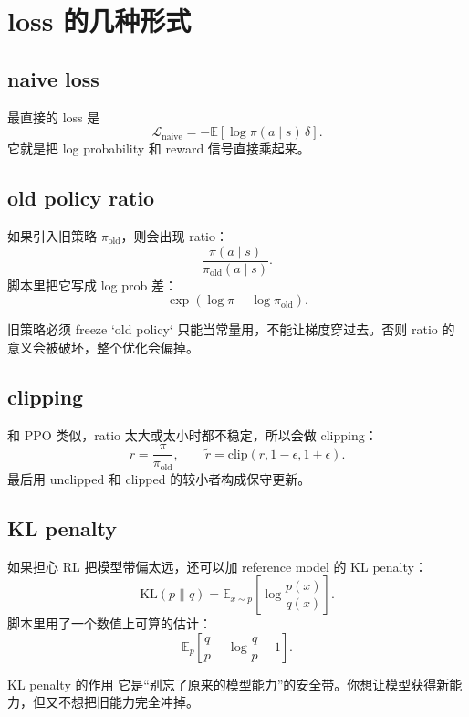 \section{loss 的几种形式}

\subsection{naive loss}

最直接的 loss 是
\[
\mathcal{L}_{\text{naive}} = -\mathbb{E}[\log \pi(a \mid s)\,\delta].
\]
它就是把 log probability 和 reward 信号直接乘起来。


\subsection{old policy ratio}

如果引入旧策略 $\pi_{\text{old}}$，则会出现 ratio：
\[
\frac{\pi(a\mid s)}{\pi_{\text{old}}(a\mid s)}.
\]
脚本里把它写成 log prob 差：
\[
\exp(\log \pi - \log \pi_{\text{old}}).
\]

\begin{warningbox}{旧策略必须 freeze}
`old policy` 只能当常量用，不能让梯度穿过去。否则 ratio 的意义会被破坏，整个优化会偏掉。
\end{warningbox}


\subsection{clipping}

和 PPO 类似，ratio 太大或太小时都不稳定，所以会做 clipping：
\[
r = \frac{\pi}{\pi_{\text{old}}}, \qquad
\tilde r = \mathrm{clip}(r, 1-\epsilon, 1+\epsilon).
\]
最后用 unclipped 和 clipped 的较小者构成保守更新。


\subsection{KL penalty}

如果担心 RL 把模型带偏太远，还可以加 reference model 的 KL penalty：
\[
\mathrm{KL}(p\|q) = \mathbb{E}_{x\sim p}\!\left[\log \frac{p(x)}{q(x)}\right].
\]
脚本里用了一个数值上可算的估计：
\[
\mathbb{E}_p\!\left[\frac{q}{p} - \log\frac{q}{p} - 1\right].
\]

\begin{importantbox}{KL penalty 的作用}
它是“别忘了原来的模型能力”的安全带。你想让模型获得新能力，但又不想把旧能力完全冲掉。
\end{importantbox}


